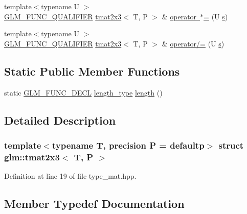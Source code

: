 \begin{DoxyCompactItemize}
\item 
{\footnotesize template$<$typename U $>$ }\\\mbox{\hyperlink{setup_8hpp_a33fdea6f91c5f834105f7415e2a64407}{G\+L\+M\+\_\+\+F\+U\+N\+C\+\_\+\+Q\+U\+A\+L\+I\+F\+I\+ER}} \mbox{\hyperlink{structglm_1_1tmat2x3}{tmat2x3}}$<$ T, P $>$ \& \mbox{\hyperlink{structglm_1_1tmat2x3_a742b3b63708e44e7c885b34eb402ad70}{operator $\ast$=}} (U \mbox{\hyperlink{glad_8h_af1b1d5edfea6a34daee7389b1b5810ad}{s}})
\item 
{\footnotesize template$<$typename U $>$ }\\\mbox{\hyperlink{setup_8hpp_a33fdea6f91c5f834105f7415e2a64407}{G\+L\+M\+\_\+\+F\+U\+N\+C\+\_\+\+Q\+U\+A\+L\+I\+F\+I\+ER}} \mbox{\hyperlink{structglm_1_1tmat2x3}{tmat2x3}}$<$ T, P $>$ \& \mbox{\hyperlink{structglm_1_1tmat2x3_aeb03b749f9cc0705bac20e5c76c7d9d0}{operator/=}} (U \mbox{\hyperlink{glad_8h_af1b1d5edfea6a34daee7389b1b5810ad}{s}})
\end{DoxyCompactItemize}
\subsection*{Static Public Member Functions}
\begin{DoxyCompactItemize}
\item 
static \mbox{\hyperlink{setup_8hpp_ab2d052de21a70539923e9bcbf6e83a51}{G\+L\+M\+\_\+\+F\+U\+N\+C\+\_\+\+D\+E\+CL}} \mbox{\hyperlink{structglm_1_1tmat2x3_a25be85bf523cf3daa1c2b6b00ad45c82}{length\+\_\+type}} \mbox{\hyperlink{structglm_1_1tmat2x3_abc8782efbb06155a31d9d2efd77adbd4}{length}} ()
\end{DoxyCompactItemize}


\subsection{Detailed Description}
\subsubsection*{template$<$typename T, precision P = defaultp$>$\newline
struct glm\+::tmat2x3$<$ T, P $>$}



Definition at line 19 of file type\+\_\+mat.\+hpp.



\subsection{Member Typedef Documentation}
\mbox{\label{structglm_1_1tmat2x3_a62523fc3d245c37e15d68c3b9729f366}} 
